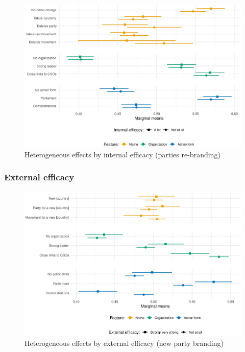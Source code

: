 \documentclass[12pt]{article}
\begin{document}
\begin{figure}[H]
\includegraphics[width=\textwidth]{./Figures/CJ2_heteff_int_eff_tradeoff.eps}
\caption{Heterogeneous effects by internal efficacy (parties re-branding)}
\end{figure}

\subsubsection{External efficacy}

\begin{figure}[H]
\includegraphics[width=\textwidth]{./Figures/CJ1_heteff_ext_eff_tradeoff.eps}
\caption{Heterogeneous effects by external efficacy (new party branding)}
\end{figure}
\end{document}
